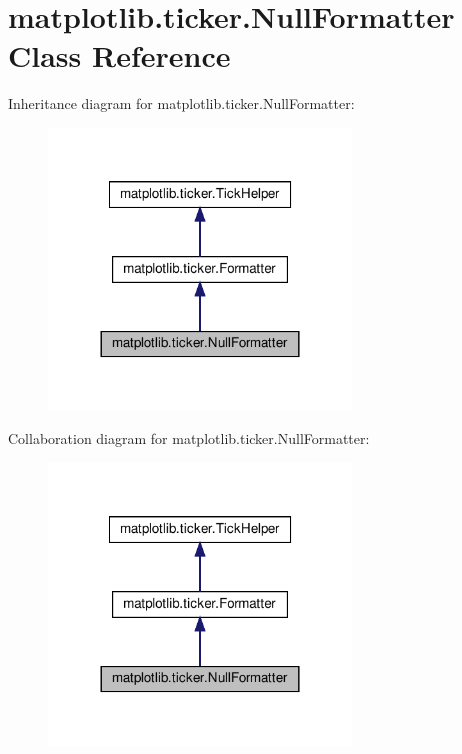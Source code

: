 \hypertarget{classmatplotlib_1_1ticker_1_1NullFormatter}{}\section{matplotlib.\+ticker.\+Null\+Formatter Class Reference}
\label{classmatplotlib_1_1ticker_1_1NullFormatter}


Inheritance diagram for matplotlib.\+ticker.\+Null\+Formatter\+:
\nopagebreak
\begin{figure}[H]
\begin{center}
\leavevmode
\includegraphics[width=228pt]{classmatplotlib_1_1ticker_1_1NullFormatter__inherit__graph}
\end{center}
\end{figure}


Collaboration diagram for matplotlib.\+ticker.\+Null\+Formatter\+:
\nopagebreak
\begin{figure}[H]
\begin{center}
\leavevmode
\includegraphics[width=228pt]{classmatplotlib_1_1ticker_1_1NullFormatter__coll__graph}
\end{center}
\end{figure}
